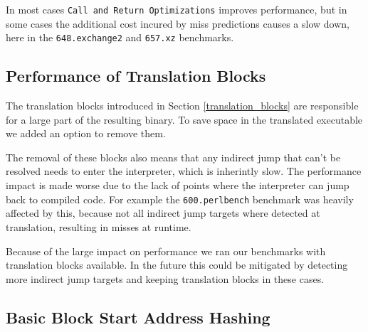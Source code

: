 \documentclass[course=eragp]{aspdoc}
\begin{document}
\par

In most cases \texttt{Call and Return Optimizations} improves performance, but in some cases the additional cost incured by miss predictions
causes a slow down, here in the \texttt{648.exchange2} and \texttt{657.xz} benchmarks.

\subsection{Performance of Translation Blocks}\label{sec:translation_blocks}

The translation blocks introduced in Section \ref{translation_blocks} are responsible for a large part of the resulting binary.
To save space in the translated executable we added an option to remove them.

\par

The removal of these blocks also means that any indirect jump that can't be resolved needs to enter the interpreter,
which is inherintly slow.
The performance impact is made worse due to the lack of points where the interpreter can jump back to compiled code.
For example the \texttt{600.perlbench} benchmark was heavily affected by this, because not all indirect jump targets
where detected at translation, resulting in misses at runtime.

\par

Because of the large impact on performance we ran our benchmarks with translation blocks available.
In the future this could be mitigated by detecting more indirect jump targets and keeping translation blocks in
these cases.

\subsection{Basic Block Start Address Hashing}
\end{document}
